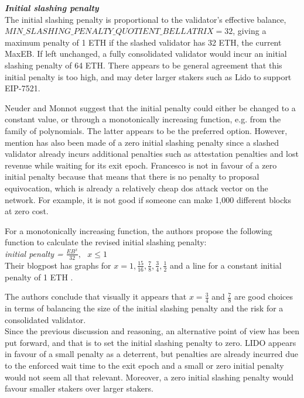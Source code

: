 \noindent
\textbf{\textit{Initial slashing penalty}} \\
The initial slashing penalty is proportional to the validator's effective balance, $MIN\_SLASHING\_PENALTY\_QUOTIENT\_BELLATRIX=32$, giving a maximum penalty of 1 ETH if the slashed validator has 32 ETH, the current MaxEB.
If left unchanged, a fully consolidated validator would incur an initial slashing penalty of 64 ETH. There appears to be general agreement that this initial penalty is too high, and may deter larger stakers such as Lido to support EIP-7521.

Neuder and Monnot suggest that the initial penalty could either be changed to a constant value, or through a monotonically increasing function, e.g.  from the family of polynomials. The latter appears to be the preferred option. However, mention has also been made of a zero initial slashing penalty since a slashed validator already incurs additional penalties such as attestation penalties and lost revenue while waiting for its exit epoch. Francesco is not in favour of a zero initial penalty because that means that there is no penalty to proposal equivocation, which is already a relatively cheap \gls{dos} attack vector on the network. For example, it is not good if someone can make 1,000 different blocks at zero cost.

For a monotonically increasing function, the authors propose the following function to calculate the revised initial slashing penalty:\\
\textit{initial penalty =} $\frac{EB^x}{32}, \texttt{ } x \leqslant 1$ \\

Their blogpost has graphs for $x=1, \frac{15}{16}, \frac{7}{8}, \frac{3}{4}, \frac{1}{2}$ and a line for a constant initial penalty of 1 ETH \cite{Neuder2023d}.

The authors conclude that visually it appears that $x = \frac{3}{4}$ and $\frac{7}{8}$ are good choices in terms of balancing the size of the initial slashing penalty and the risk for a consolidated validator.\\

Since the previous discussion and reasoning, an alternative point of view has been put forward, and that is to set the initial slashing penalty to zero. LIDO appears in favour of a small penalty as a deterrent, but penalties are already incurred due to the enforced wait time to the exit epoch and a small or zero initial penalty would not seem all that relevant. Moreover, a zero initial slashing penalty would favour smaller stakers over larger stakers.

